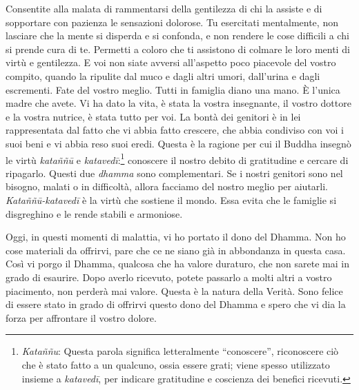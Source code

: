 Consentite alla malata di rammentarsi della gentilezza di chi la assiste
e di sopportare con pazienza le sensazioni dolorose. Tu esercitati
mentalmente, non lasciare che la mente si disperda e si confonda, e non
rendere le cose difficili a chi si prende cura di te. Permetti a coloro
che ti assistono di colmare le loro menti di virtù e gentilezza. E voi
non siate avversi all'aspetto poco piacevole del vostro compito, quando
la ripulite dal muco e dagli altri umori, dall'urina e dagli escrementi.
Fate del vostro meglio. Tutti in famiglia diano una mano. È l'unica
madre che avete. Vi ha dato la vita, è stata la vostra insegnante, il
vostro dottore e la vostra nutrice, è stata tutto per voi. La bontà dei
genitori è in lei rappresentata dal fatto che vi abbia fatto crescere,
che abbia condiviso con voi i suoi beni e vi abbia reso suoi eredi.
Questa è la ragione per cui il Buddha insegnò le virtù \emph{kataññū} e
\emph{katavedī}:\footnote{\emph{Kataññu}: Questa parola significa
  letteralmente ``conoscere'', riconoscere ciò che è stato fatto a un
  qualcuno, ossia essere grati; viene spesso utilizzato insieme a
  \emph{katavedī}, per indicare gratitudine e coscienza dei benefici
  ricevuti.} conoscere il nostro debito di gratitudine e cercare di
ripagarlo. Questi due \emph{dhamma} sono complementari. Se i nostri
genitori sono nel bisogno, malati o in difficoltà, allora facciamo del
nostro meglio per aiutarli. \emph{Kataññū-katavedī} è la virtù che
sostiene il mondo. Essa evita che le famiglie si disgreghino e le rende
stabili e armoniose.

Oggi, in questi momenti di malattia, vi ho portato il dono del Dhamma.
Non ho cose materiali da offrirvi, pare che ce ne siano già in
abbondanza in questa casa. Così vi porgo il Dhamma, qualcosa che ha
valore duraturo, che non sarete mai in grado di esaurire. Dopo averlo
ricevuto, potete passarlo a molti altri a vostro piacimento, non perderà
mai valore. Questa è la natura della Verità. Sono felice di essere stato
in grado di offrirvi questo dono del Dhamma e spero che vi dia la forza
per affrontare il vostro dolore.

